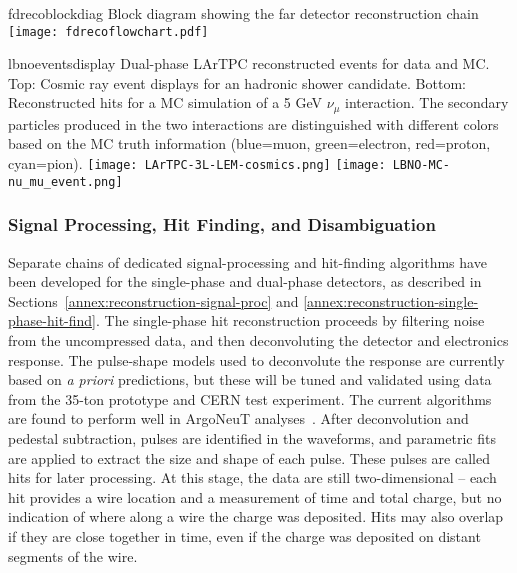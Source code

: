\begin{cdrfigure}{fdrecoblockdiag}
{Block diagram showing the far detector reconstruction chain}
\texttt{[image: fdrecoflowchart.pdf]}
\end{cdrfigure}


\begin{cdrfigure}{lbnoeventsdisplay}
{
Dual-phase LArTPC reconstructed events for data and MC.
Top: Cosmic ray event displays for an hadronic shower candidate.
Bottom: Reconstructed hits for a MC simulation of a 5 GeV $\nu_{\mu}$ interaction.
The secondary particles produced in the two interactions are distinguished with different colors based on the MC truth information (blue=muon, green=electron, red=proton, cyan=pion).
}
\texttt{[image: LArTPC-3L-LEM-cosmics.png]}
\texttt{[image: LBNO-MC-nu\_mu\_event.png]}
\end{cdrfigure}

\subsubsection{Signal Processing, Hit Finding, and Disambiguation}

Separate chains of dedicated signal-processing and hit-finding 
algorithms have been developed for the single-phase and dual-phase detectors,
as described in Sections~\ref{annex:reconstruction-signal-proc} and \ref{annex:reconstruction-single-phase-hit-find}.
The single-phase hit reconstruction proceeds by filtering noise
from the uncompressed data, and then deconvoluting the 
detector and electronics response.
The pulse-shape models used to deconvolute the response are currently
based on {\it a priori} predictions, but these will be tuned and
validated using data from the 35-ton prototype and CERN test experiment.
The current algorithms are found to perform well in ArgoNeuT analyses~\cite{Anderson:2012vc}.
After deconvolution and pedestal subtraction, pulses are identified in
the waveforms, and parametric fits are applied to extract the size and
shape of each pulse. These pulses are called hits for later processing.
At this stage, the data are still two-dimensional -- each hit provides
a wire location and a measurement of time and total charge,
but no indication of where along a wire the charge was deposited.
Hits may also overlap if they are close together in time, 
even if the charge was deposited on distant segments of the wire.

